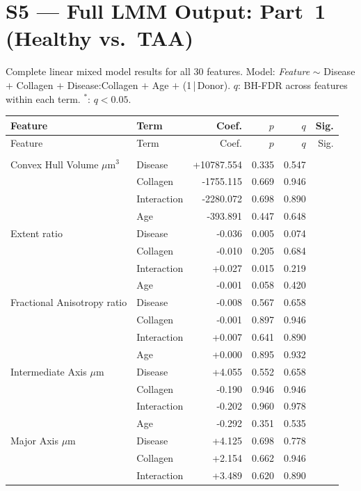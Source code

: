 \documentclass[11pt,a4paper]{article}
\begin{document}
\section*{S5 — Full LMM Output: Part~1 (Healthy vs.\ TAA)}
Complete linear mixed model results for all 30 features.
Model: \textit{Feature} $\sim$ Disease $+$ Collagen $+$ Disease:Collagen $+$ Age $+$ (1\,|\,Donor).
$q$: BH-FDR across features within each term. $^{*}$: $q < 0.05$.
\vspace{1em}
\begin{longtable}{llrrrr}
\toprule
Feature & Term & Coef. & $p$ & $q$ & Sig. \\
\midrule\endfirsthead
\toprule Feature & Term & Coef. & $p$ & $q$ & Sig. \\\midrule\endhead
\bottomrule\endfoot
\multicolumn{6}{l}{\textit{Actin}} \\
  Convex Hull Volume $\mu$m$^{3}$ & Disease & +10787.554 & 0.335 & 0.547 &  \\
   & Collagen & -1755.115 & 0.669 & 0.946 &  \\
   & Interaction & -2280.072 & 0.698 & 0.890 &  \\
   & Age & -393.891 & 0.447 & 0.648 &  \\
  Extent ratio & Disease & -0.036 & 0.005 & 0.074 &  \\
   & Collagen & -0.010 & 0.205 & 0.684 &  \\
   & Interaction & +0.027 & 0.015 & 0.219 &  \\
   & Age & -0.001 & 0.058 & 0.420 &  \\
  Fractional Anisotropy ratio & Disease & -0.008 & 0.567 & 0.658 &  \\
   & Collagen & -0.001 & 0.897 & 0.946 &  \\
   & Interaction & +0.007 & 0.641 & 0.890 &  \\
   & Age & +0.000 & 0.895 & 0.932 &  \\
  Intermediate Axis $\mu$m & Disease & +4.055 & 0.552 & 0.658 &  \\
   & Collagen & -0.190 & 0.946 & 0.946 &  \\
   & Interaction & -0.202 & 0.960 & 0.978 &  \\
   & Age & -0.292 & 0.351 & 0.535 &  \\
  Major Axis $\mu$m & Disease & +4.125 & 0.698 & 0.778 &  \\
   & Collagen & +2.154 & 0.662 & 0.946 &  \\
   & Interaction & +3.489 & 0.620 & 0.890 &  \\

\end{longtable}
\end{document}
